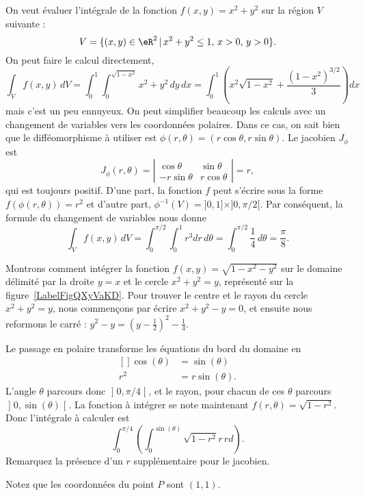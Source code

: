 \begin{example}
	On veut évaluer l'intégrale de la fonction $f(x,y)= x^2+y^2$ sur la région $V$ suivante :
	\[
		V=\{(x,y) \in \eR^2\,\vert\, x^2+y^2\leq 1,\, x>0,\, y>0\}.
	\]
	On peut faire le calcul directement,
	\[
		\int_{V}f(x,y)\, dV=\int_0^1\int_0^{\sqrt{1-x^2}}x^2+y^2\, dy\,dx=\int_0^1\left(x^2\sqrt{1-x^2} + \frac{(1-x^2)^{3/2}}{3}\right) dx
	\]
	mais c'est un peu ennuyeux. On peut simplifier beaucoup les calculs avec un changement de variables vers les coordonnées polaires. Dans ce cas, on sait bien que le difféomorphisme à utiliser est $\phi(r,\theta)=(r\cos \theta, r\sin\theta)$. Le jacobien  $J_{\phi}$ est
	\begin{equation}
		J_{\phi}(r, \theta)= \left\vert\begin{array}{cc}
			\cos \theta   & \sin \theta  \\
			-r\sin \theta & r\cos \theta
		\end{array}\right\vert= r,
	\end{equation}
	qui est toujours positif. D'une part, la fonction $f$ peut s'écrire sous la forme $f(\phi(r,\theta))=r^2$ et d'autre part, $\phi^{-1}(V)=]0,1]\times]0, \pi/2[$. Par conséquent, la formule du changement de variables nous donne
	\[
		\int_{V}f(x,y)\, dV=\int_0^{\pi/2}\int_0^{1}r^3 dr\,d\theta=\int_0^{\pi/2}\frac{1}{4}\,d\theta=\frac{\pi}{8}.
	\]
\end{example}

\begin{example}
	Montrons comment intégrer la fonction $f(x,y)=\sqrt{1-x^2-y^2}$ sur le domaine délimité par la droite $y=x$ et le cercle $x^2+y^2=y$, représenté sur la figure~\ref{LabelFigQXyVaKD}. Pour trouver le centre et le rayon du cercle $x^2+y^2=y$, nous commençons par écrire $x^2+y^2-y=0$, et ensuite nous reformons le carré : $y^2-y=(y-\frac{ 1 }{2})^2-\frac{1}{ 4 }$.
	\newcommand{\CaptionFigQXyVaKD}{Passage en polaire pour intégrer sur un morceau de cercle.}
	

	Le passage en polaire transforme les équations du bord du domaine en
	\begin{equation}
		\begin{aligned}[]
			\cos(\theta) & =\sin(\theta)   \\
			r^2          & =r\sin(\theta).
		\end{aligned}
	\end{equation}
	L'angle $\theta$ parcours donc $\mathopen] 0 , \pi/4 \mathclose[$, et le rayon, pour chacun de ces $\theta$ parcours $\mathopen] 0 , \sin(\theta) \mathclose[$. La fonction à intégrer se note maintenant $f(r,\theta)=\sqrt{1-r^2}$. Donc l'intégrale à calculer est
	\begin{equation}		\label{PgRapIntMultFubiniBoutCercle}
		\int_{0}^{\pi/4}\left( \int_0^{\sin(\theta)}\sqrt{1-r^2}r\,rd \right).
	\end{equation}
	Remarquez la présence d'un $r$ supplémentaire pour le jacobien.

	Notez que les coordonnées du point $P$ sont $(1,1)$.
\end{example}

